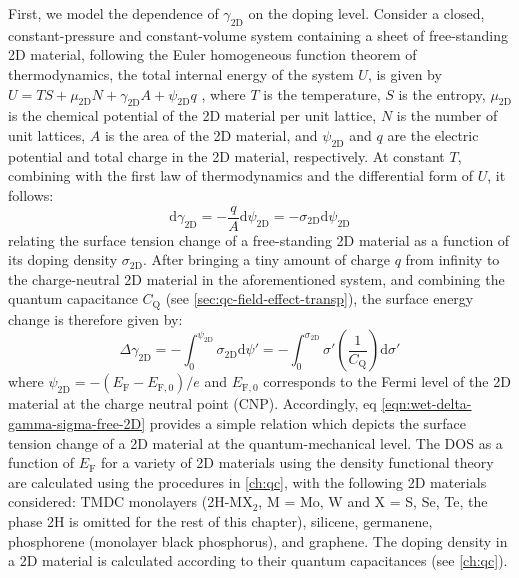 First, we model the dependence of \(\gamma_{\mathrm{2D}}\) on the doping
level. Consider a closed, constant-pressure and constant-volume system
containing a sheet of free-standing 2D material, following the Euler
homogeneous function theorem of thermodynamics, the total internal
energy of the system \(U\), is given by \(U = TS + \mu_{\mathrm{2D}} N +
\gamma_{\mathrm{2D}} A + \psi_{\mathrm{2D}} q\)
\cite{Bard_1980_electrochem_book}, where \(T\) is the temperature, \(S\) is
the entropy, \(\mu_{\mathrm{2D}}\) is the chemical potential of the 2D
material per unit lattice, \(N\) is the number of unit lattices, \(A\) is
the area of the 2D material, and \(\psi_{\mathrm{2D}}\) and \(q\) are the
electric potential and total charge in the 2D material,
respectively. At constant \(T\), combining with the first law of
thermodynamics and the differential form of \(U\), it follows:
\begin{equation}
\label{eqn:wet-dgamma-dpsi}
\mathrm{d} \gamma_{\mathrm{2D}} = -\frac{q}{A} \mathrm{d} \psi_{\mathrm{2D}}
                                = -\sigma_{\mathrm{2D}} \mathrm{d} \psi_{\mathrm{2D}}
\end{equation}
relating the surface tension change of a free-standing 2D material as
a function of its doping density \(\sigma_{\mathrm{2D}}\).
%
After bringing a tiny amount of charge
\(q\) from infinity to the charge-neutral 2D material in the
aforementioned system, and combining the quantum capacitance $C_{\mathrm{Q}}$ (see \autoref{sec:qc-field-effect-transp}),
the surface energy change is therefore given
by:
\begin{equation}
\label{eqn:wet-delta-gamma-sigma-free-2D}
\Delta \gamma_{\mathrm{2D}} = - \int_{0}^{\psi_{\mathrm{2D}}} \sigma_{\mathrm{2D}} \mathrm{d}\psi'
                            = - \int_{0}^{\sigma_{\mathrm{2D}}} \sigma' \left( \frac{1}{C_{\mathrm{Q}}}\right) \mathrm{d} \sigma'
\end{equation}
where
\(\psi_{\mathrm{2D}} = -(E_{\mathrm{F}} - E_{\mathrm{F,0}})/e\) and
\(E_{\mathrm{F,0}}\) corresponds to the Fermi level of the 2D material
at the charge neutral point (CNP). Accordingly, eq
\autoref{eqn:wet-delta-gamma-sigma-free-2D} provides a simple relation which
depicts the surface tension change of a 2D material at the
quantum-mechanical level.
%
The DOS as a function of \(E_{\mathrm{F}}\) for a variety of 2D
materials using the density functional theory are calculated using the
procedures in \autoref{ch:qc}, with the following 2D materials
considered: TMDC monolayers (2H-MX\(_{\text{2}}\), M = Mo, W and X =
S, Se, Te, the phase 2H is omitted for the rest of this chapter),
silicene, germanene, phosphorene (monolayer black phosphorus), and
graphene.  The doping density in a 2D material is calculated according
to their quantum capacitances (see \autoref{ch:qc}).

